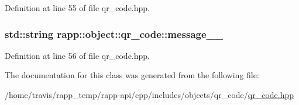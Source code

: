 Definition at line 55 of file qr\-\_\-code.\-hpp.

\hypertarget{classrapp_1_1object_1_1qr__code_a61aeaac1ba77a356c11d03ba9b8ad3e7}{
\subsubsection[{message\-\_\-\-\_\-}]{\setlength{\rightskip}{0pt plus 5cm}std\-::string rapp\-::object\-::qr\-\_\-code\-::message\-\_\-\-\_\-\hspace{0.3cm}{\ttfamily [private]}}}\label{classrapp_1_1object_1_1qr__code_a61aeaac1ba77a356c11d03ba9b8ad3e7}


Definition at line 56 of file qr\-\_\-code.\-hpp.



The documentation for this class was generated from the following file\-:\begin{DoxyCompactItemize}
\item 
/home/travis/rapp\-\_\-temp/rapp-\/api/cpp/includes/objects/qr\-\_\-code/\hyperlink{qr__code_8hpp}{qr\-\_\-code.\-hpp}\end{DoxyCompactItemize}
